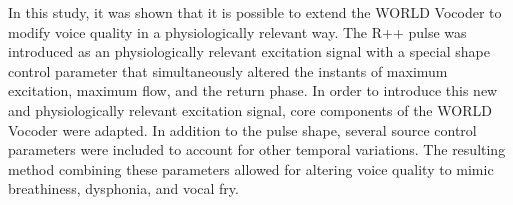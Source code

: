 \documentclass[final,5p,times,twocolumn]{elsarticle}
\begin{document}


In this study, it was shown that it is possible to extend the WORLD Vocoder to modify voice quality in a physiologically relevant way. The R++ pulse was introduced as an physiologically relevant excitation signal with a special shape control parameter that simultaneously altered the instants of maximum excitation, maximum flow, and the return phase. In order to introduce this new and physiologically relevant excitation signal, core components of the WORLD Vocoder were adapted. In addition to the pulse shape, several source control parameters were included to account for other temporal variations. The resulting method combining these parameters allowed for altering voice quality to mimic breathiness, dysphonia, and vocal fry. 
\end{document}
